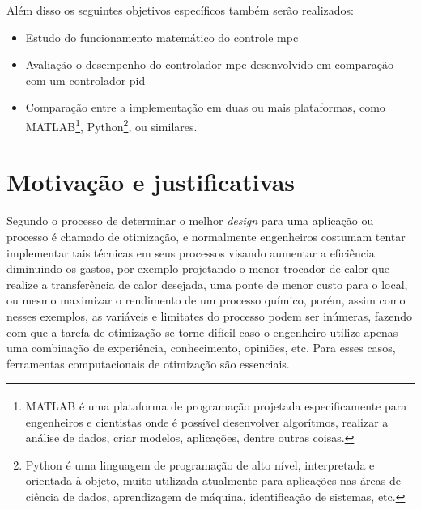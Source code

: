 Além disso os seguintes objetivos específicos também serão realizados:
\begin{itemize}
    \item Estudo do funcionamento matemático do controle \acrshort{mpc}
    \item Avaliação o desempenho do controlador \acrshort{mpc} desenvolvido em
        comparação com um controlador \acrshort{pid}
    \item Comparação entre a implementação em duas ou mais plataformas,
        como MATLAB\textsuperscript{\tiny\textregistered}\footnote{
            MATLAB\textsuperscript{\tiny\textregistered} é uma plataforma                           %
            de programação projetada especificamente para engenheiros e cientistas                  %
            onde é possível desenvolver algorítmos, realizar a análise de dados,                    %
            criar modelos, aplicações, dentre outras coisas.},                                      %
        Python\footnote{
            Python é uma linguagem de programação de alto nível,                                    %
            interpretada e orientada à objeto, muito utilizada atualmente para                      %
            aplicações nas áreas de ciência de dados, aprendizagem de máquina,                      %
            identificação de sistemas, etc.},                                                       %
        ou similares.
\end{itemize}

\section{Motivação e justificativas}
\label{sec:motivacao_e_justificativas}

Segundo  o processo de determinar o melhor \textit{design}
para uma aplicação ou processo é chamado de otimização, e normalmente engenheiros
costumam tentar implementar tais técnicas em seus processos visando aumentar a
eficiência diminuindo os gastos, por exemplo projetando o menor trocador de calor
que realize a transferência de calor desejada, uma ponte de menor custo para o local,
ou mesmo maximizar o rendimento de um processo químico, porém, assim como nesses
exemplos, as variáveis e limitates do processo podem ser inúmeras, fazendo com que a
tarefa de otimização se torne difícil caso o engenheiro utilize apenas uma combinação
de experiência, conhecimento, opiniões, etc. Para esses casos, ferramentas
computacionais de otimização são essenciais.

